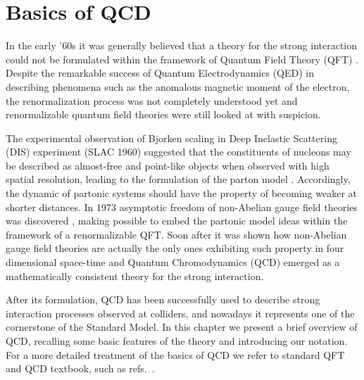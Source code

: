 \chapter{Basics of QCD}
In the early '60s it was generally believed that a theory for the strong interaction could not be formulated
within the framework of Quantum Field Theory (QFT) \cite{tHooft:1998qmr}.
Despite the remarkable success of Quantum Electrodynamics (QED) in describing phenomena such as the anomalous magnetic moment of the electron,
the renormalization process was not completely understood yet and 
renormalizable quantum field theories were still looked at with suspicion.
 
%
The experimental observation of Bjorken scaling \cite{PhysRev.179.1547} in Deep Inelastic Scattering (DIS) experiment (SLAC 1960)
suggested that the constituents of nucleons may be described as almost-free and point-like objects 
when observed with high spatial resolution, leading to the formulation of the parton model \cite{PhysRevLett.23.1415}.
Accordingly, the dynamic of  partonic systems should have the property of becoming weaker at shorter distances. 
In 1973 asymptotic freedom of non-Abelian gauge field theories was discovered \cite{PhysRevLett.30.1346, PhysRevLett.30.1343},
making possible to embed the partonic model ideas within the framework of a renormalizable QFT.
%
Soon after it was shown how non-Abelian gauge field theories are actually the only ones exhibiting such property
in four dimensional space-time \cite{PhysRevLett.31.851} and Quantum Chromodynamics (QCD) emerged as a mathematically 
consistent theory for the strong interaction.  

%
After its formulation, QCD has been successfully used to describe strong interaction processes observed at colliders, and
nowadays it represents one of the cornerstone of the Standard Model. In this chapter we present
a brief overview of QCD, recalling some basic features of the theory and introducing our notation. 
For a more detailed treatment of the basics of QCD we refer to standard QFT and QCD textbook, such
as refs.~\cite{Ellis:1991qj,Muta:2010xua,Collins:1984xc}.


